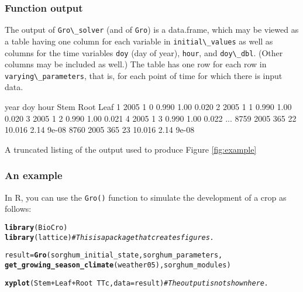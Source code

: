 \documentclass{article}\usepackage[]{graphicx}\usepackage[]{color}
\makeatletter
\newcommand{\hlcom}[1]{\textcolor[rgb]{0.678,0.584,0.686}{\textit{#1}}}%
\newcommand{\hlopt}[1]{\textcolor[rgb]{0,0,0}{#1}}%
\newcommand{\hlstd}[1]{\textcolor[rgb]{0.345,0.345,0.345}{#1}}%
\newcommand{\hlkwb}[1]{\textcolor[rgb]{0.69,0.353,0.396}{#1}}%
\newcommand{\hlkwc}[1]{\textcolor[rgb]{0.333,0.667,0.333}{#1}}%
\newcommand{\hlkwd}[1]{\textcolor[rgb]{0.737,0.353,0.396}{\textbf{#1}}}%
\newenvironment{kframe}{%
 \def\at@end@of@kframe{}%
 \ifinner\ifhmode%
  \def\at@end@of@kframe{\end{minipage}}%
  \begin{minipage}{\columnwidth}%
 \fi\fi%
 \def\FrameCommand##1{\hskip\@totalleftmargin \hskip-\fboxsep
 \colorbox{shadecolor}{##1}\hskip-\fboxsep
     \hskip-\linewidth \hskip-\@totalleftmargin \hskip\columnwidth}%
 \MakeFramed {\advance\hsize-\width
   \@totalleftmargin\z@ \linewidth\hsize
   \@setminipage}}%
 {\par\unskip\endMakeFramed%
 \at@end@of@kframe}
\newenvironment{knitrout}{}{} %
\newcommand{\code}[1]{\lstinline[style=C++style]{#1}}
\makeatother
\begin{document}
\subsubsection{Function output}
The output of \code{Gro\_solver} (and of \code{Gro}) is a data.frame,
which may be viewed as a table having one column for each variable in
\code{initial\_values} as well as columns for the time variables
\code{doy} (day of year), \code{hour}, and \code{doy\_dbl}.  (Other
columns may be included as well.)  The table has one row for each row
in \code{varying\_parameters}, that is, for each point of time for
which there is input data.

\begin{table}[!htbp]
\begin{center}
\begin{Rlisting}
     year doy hour    Stem   Root    Leaf
   1 2005   1    0   0.990   1.00   0.020
   2 2005   1    1   0.990   1.00   0.020
   3 2005   1    2   0.990   1.00   0.021
   4 2005   1    3   0.990   1.00   0.022
...
8759 2005 365   22  10.016   2.14   9e-08
8760 2005 365   23  10.016   2.14   9e-08
\end{Rlisting}
\caption{\label{tab:example_output} A truncated listing of the output used to produce Figure \ref{fig:example}}
\end{center}
\end{table}

\subsubsection{An example}
In R, you can use the \code{Gro()} function to simulate the
development of a crop as follows:

\begin{knitrout}
\color{fgcolor}\begin{kframe}
\begin{alltt}
\hlkwd{library}\hlstd{(BioCro)}
\hlkwd{library}\hlstd{(lattice)}  \hlcom{# This is a package that creates figures.}

\hlstd{result} \hlkwb{=} \hlkwd{Gro}\hlstd{(sorghum_initial_state, sorghum_parameters,}
             \hlkwd{get_growing_season_climate}\hlstd{(weather05), sorghum_modules)}
\end{alltt}


{\ttfamily\noindent\bfseries{}}\begin{alltt}
\hlkwd{xyplot}\hlstd{(Stem} \hlopt{+} \hlstd{Leaf} \hlopt{+} \hlstd{Root} \hlopt{~} \hlstd{TTc,} \hlkwc{data}\hlstd{=result)}  \hlcom{# The output is not shown here.}
\end{alltt}


{\ttfamily\noindent\bfseries\color{errorcolor}{\#\# Error in eval(substitute(groups), data, environment(x)): object 'result' not found}}\end{kframe}
\end{knitrout}
\end{document}
